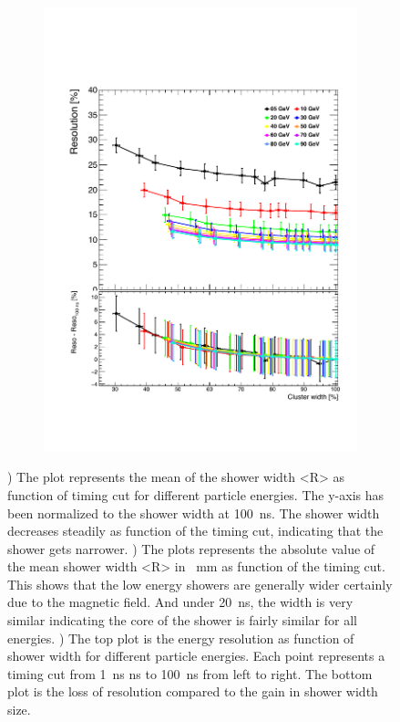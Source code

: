 \begin{figure}[t]
  \begin{minipage}{.45\textwidth}
    \centering
    \begin{subfigure}[t]{1\textwidth}
      \centering
      \includegraphics[width=1\linewidth]{chap6/fig_TimingILD/NoSmearing/ShowerWidth_Resolution_noSmearing}
      \vspace{-6ex}
      \caption{}  \label{fig:ShowerWidthResoNoSmearing}
    \end{subfigure}
  \end{minipage}
  \caption{) The plot represents the mean of the shower width <R> as function of timing cut for different particle energies. The y-axis has been normalized to the shower width at \SI{100}{\nano\second}. The shower width decreases steadily as function of the timing cut, indicating that the shower gets narrower. ) The plots represents the absolute value of the mean shower width <R> in \SI{}{\milli\meter} as function of the timing cut. This shows that the low energy showers are generally wider certainly due to the magnetic field. And under \SI{20}{\nano\second}, the width is very similar indicating the core of the shower is fairly similar for all energies. ) The top plot is the energy resolution as function of shower width for different particle energies. Each point represents a timing cut from \SI{1}{\nano\second} ns to \SI{100}{\nano\second} from left to right. The bottom plot is the loss of resolution compared to the gain in shower width size.}
\end{figure}

